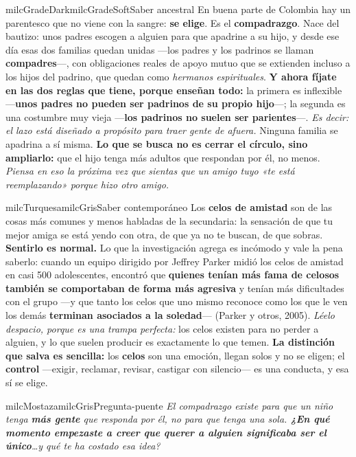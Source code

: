 \documentclass[11pt,letterpaper]{article}
\begin{document}
\begin{softbox}{milcGradeDark}{milcGradeSoft}{Saber ancestral}
En buena parte de Colombia hay un parentesco que no viene con la sangre: \textbf{se elige}. Es el \textbf{compadrazgo}. Nace del bautizo: unos padres escogen a alguien para que apadrine a su hijo, y desde ese día esas dos familias quedan unidas ---los padres y los padrinos se llaman \textbf{compadres}---, con obligaciones reales de apoyo mutuo que se extienden incluso a los hijos del padrino, que quedan como \emph{hermanos espirituales}. \textbf{Y ahora fíjate en las dos reglas que tiene, porque enseñan todo:} la primera es inflexible ---\textbf{unos padres no pueden ser padrinos de su propio hijo}---; la segunda es una costumbre muy vieja ---\textbf{los padrinos no suelen ser parientes}---. \emph{Es decir: el lazo está diseñado a propósito para traer gente de afuera.} Ninguna familia se apadrina a sí misma. \textbf{Lo que se busca no es cerrar el círculo, sino ampliarlo:} que el hijo tenga más adultos que respondan por él, no menos. \emph{Piensa en eso la próxima vez que sientas que un amigo tuyo «te está reemplazando» porque hizo otro amigo.}
\end{softbox}

\begin{softbox}{milcTurquesa}{milcGris}{Saber contemporáneo}
Los \textbf{celos de amistad} son de las cosas más comunes y menos habladas de la secundaria: la sensación de que tu mejor amiga se está yendo con otra, de que ya no te buscan, de que sobras. \textbf{Sentirlo es normal.} Lo que la investigación agrega es incómodo y vale la pena saberlo: cuando un equipo dirigido por Jeffrey Parker midió los celos de amistad en casi 500 adolescentes, encontró que \textbf{quienes tenían más fama de celosos también se comportaban de forma más agresiva} y tenían más dificultades con el grupo ---y que tanto los celos que uno mismo reconoce como los que le ven los demás \textbf{terminan asociados a la soledad}--- (Parker y otros, 2005). \emph{Léelo despacio, porque es una trampa perfecta:} los celos existen para no perder a alguien, y lo que suelen producir es exactamente lo que temen. \textbf{La distinción que salva es sencilla:} los \textbf{celos} son una emoción, llegan solos y no se eligen; el \textbf{control} ---exigir, reclamar, revisar, castigar con silencio--- es una conducta, y esa sí se elige.
\end{softbox}

\begin{softbox}{milcMostaza}{milcGris}{Pregunta-puente}
\textit{El compadrazgo existe para que un niño tenga \textbf{más gente} que responda por él, no para que tenga una sola. \textbf{¿En qué momento empezaste a creer que querer a alguien significaba ser el único}\ldots y qué te ha costado esa idea?}
\end{softbox}
\end{document}
